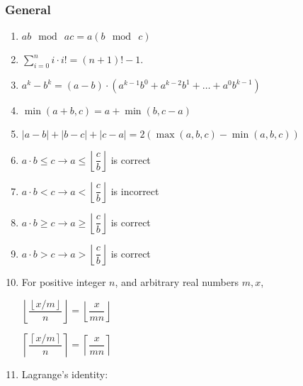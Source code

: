 \begin{enumerate}

            \end{enumerate}
\subsubsection{General}\begin{enumerate}

            \item $\displaystyle ab \mod\ ac=a(b \mod\ c)$
            \item $\displaystyle \sum_{i = 0}^n{i\cdot i!=(n + 1)! - 1}$.
            \item $\displaystyle a^k - b^k = (a - b) \cdot (a^{k - 1}b^0 + a^{k - 2}b^1 + … + a^0b^{k - 1})$
            \item $\displaystyle \min(a + b, c) = a + \min(b, c - a)$
            \item $|a - b| + |b - c| + |c - a| = 2 (\max (a, b, c) - \min (a, b, c))$
            \item $\displaystyle a \cdot b \leq c \rightarrow a \leq \left \lfloor \dfrac{c}{b} \right \rfloor$ is correct
            
            \item $\displaystyle a \cdot b < c \rightarrow a < \left \lfloor \dfrac{c}{b} \right \rfloor$ is
                incorrect
            
            \item $\displaystyle a \cdot b \geq c \rightarrow a \geq \left \lfloor \dfrac{c}{b} \right \rfloor$ is correct
            
            \item $\displaystyle a \cdot b > c \rightarrow a > \left \lfloor \dfrac{c}{b} \right \rfloor$ is correct
            
            \item 
                For positive integer $n$, and arbitrary real numbers $m,x$,

                $\displaystyle \left \lfloor \dfrac{\left \lfloor x/m \right \rfloor}{n} \right \rfloor = \left
                    \lfloor
                    \dfrac{x}{mn} \right \rfloor$

                $\displaystyle \left \lceil \dfrac{\left \lceil x/m \right \rceil}{n} \right \rceil = \left \lceil
                    \dfrac{x}{mn} \right \rceil$

            
            \item 
                Lagrange’s identity:


\end{enumerate}
